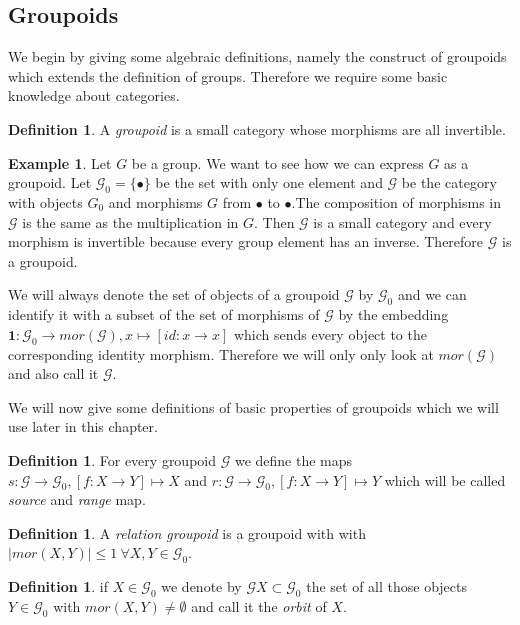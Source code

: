 \documentclass[12pt,a4paper]{scrartcl}
\theoremstyle{plain}
\theoremstyle{definition}
\newtheorem{Definition}[Theorem]{Definition}
\newtheorem{Example}[Theorem]{Example}
\numberwithin{equation}{section}
\newcommand{\2}{\mathbb{Z} / 2 \mathbb{Z}}
\newcommand{\G}{\mathcal{G}}
\newcommand{\1}{\bar{1}}
\newcommand{\0}{\bar{0}}
\begin{document}
\subsection{Groupoids}
We begin by giving some algebraic definitions, namely the construct of groupoids which extends the definition of groups. Therefore we require some basic knowledge about categories. 
\begin{Definition}
	A \emph{groupoid} is a small category whose morphisms are all invertible.
\end{Definition}
\begin{Example} \label{group}
	Let $G$ be a group. We want to see how we can express $G$ as a groupoid. Let $\mathcal{G}_0 = \{\bullet\}$ be the set with only one element  and $\mathcal{G}$ be the category with objects $G_0$ and morphisms $G$ from $\bullet$ to $\bullet$.The composition of morphisms in $\mathcal{G}$ is the same as the multiplication in $G$. Then $\mathcal{G}$ is a small category and every morphism is invertible because every group element has an inverse. Therefore $\mathcal{G}$ is a groupoid.
\end{Example}
We will always denote the set of objects of a groupoid $\mathcal{G}$ by $\mathcal{G}_0$ and we can identify it with a subset of the set of morphisms of $\mathcal{G}$ by the embedding $\textbf{1}: \mathcal{G}_0 \to mor(\mathcal{G}), x \mapsto [id: x \to x]$ which sends every object to the corresponding identity morphism. Therefore we will only only look at $mor(\mathcal{G})$ and also call it $\mathcal{G}$. 

We will now give some definitions of basic properties of groupoids which we will use later in this chapter.

\begin{Definition}
	For every groupoid $\mathcal{G}$ we define the maps $s: \mathcal{G} \to \mathcal{G}_0, [f:X \to Y] \mapsto X$ and $r: \mathcal{G} \to \mathcal{G}_0, [f:X \to Y] \mapsto Y$ which will be called \emph{source} and \emph{range} map.
\end{Definition}
\begin{Definition}
	A \emph{relation groupoid} is a groupoid with with $|mor(X, Y)| \leq 1 \ \forall X,Y \in \G_0$.
\end{Definition}

\begin{Definition}
	if $X \in \G_0$ we denote by $\G X \subset \G_0$ the set of all those objects $Y \in \G_0$ with $mor(X, Y) \neq \emptyset$ and call it the \emph{orbit} of $X$.
\end{Definition}
\end{document}
